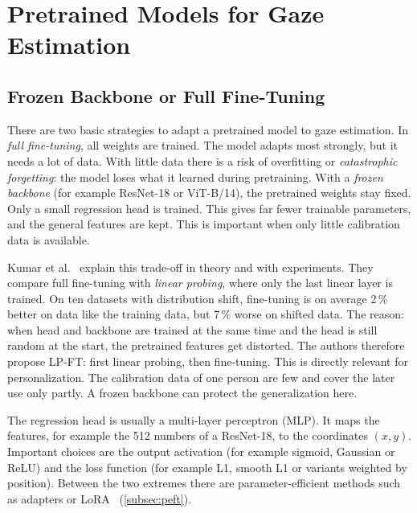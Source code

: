 \section{Pretrained Models for Gaze Estimation}
\label{sec:pretrained}
\subsection{Frozen Backbone or Full Fine-Tuning}
\label{subsec:frozen_full}
There are two basic strategies to adapt a pretrained model to gaze estimation.
In \emph{full fine-tuning}, all weights are trained. The model adapts most
strongly, but it needs a lot of data. With little data there is a risk of
overfitting or \emph{catastrophic forgetting}: the model loses what it learned
during pretraining. With a \emph{frozen backbone} (for example ResNet-18 or
ViT-B/14), the pretrained weights stay fixed. Only a small regression head is
trained. This gives far fewer trainable parameters, and the general features
are kept. This is important when only little calibration data is available.

Kumar et al.~\cite{kumar2022finetuning} explain this trade-off in theory and
with experiments. They compare full fine-tuning with \emph{linear probing},
where only the last linear layer is trained. On ten datasets with distribution
shift, fine-tuning is on average 2\,\% better on data like the training data,
but 7\,\% worse on shifted data. The reason: when head and backbone are trained
at the same time and the head is still random at the start, the pretrained
features get distorted. The authors therefore propose LP-FT: first linear
probing, then fine-tuning. This is directly relevant for personalization. The
calibration data of one person are few and cover the later use only partly. A
frozen backbone can protect the generalization here.

The regression head is usually a multi-layer perceptron (MLP). It maps the
features, for example the 512 numbers of a ResNet-18, to the coordinates
$(x, y)$. Important choices are the output activation (for example sigmoid,
Gaussian or ReLU) and the loss function (for example L1, smooth L1 or variants
weighted by position). Between the two extremes there are parameter-efficient
methods such as adapters or LoRA~\cite{hu2022lora} (\cref{subsec:peft}).

